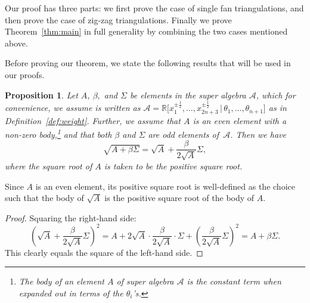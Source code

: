 \documentclass[pdftex]{sigma}
\numberwithin{equation}{section}
\newtheorem{Proposition}[Theorem]{Proposition}
 {\theoremstyle{Definition}
\newtheorem{Definition}[Theorem]{Definition}
\newtheorem{Example}[Theorem]{Example}
\newtheorem{Remark}[Theorem]{Remark}
\newtheorem{Question}[Theorem]{Question} }
\begin{document}
Our proof has three parts: we first prove the case of single fan triangulations, and then prove the case of zig-zag triangulations. Finally we prove Theorem~\ref{thm:main} in full generality by combining the two cases mentioned above.

Before proving our theorem, we state the following results that will be used in our proofs.

\begin{Proposition} \label{lemma:theta32}
 Let $A$, $\beta,$ and $\Sigma$ be elements in the super algebra $\mathcal A$, which for convenience, we assume is written as
 $\mathcal A = {\mathbb R}\bigl[x_1^{\pm\frac{1}{2}},\dots,x_{2n+3}^{\pm\frac{1}{2}} \,|\, \theta_1,\dots,\theta_{n+1}\bigr]$ as in Definition~{\rm \ref{def:weight}}.
 Further, we assume that $A$ is an even element with a non-zero body,\footnote{The \emph{body} of an element $A$ of super algebra $\mathcal A$ is the constant term when expanded out in terms of the $\theta_i$'s.}
 and that both $\beta$ and $\Sigma$ are odd elements of~$\mathcal A$. Then we have
 \[\sqrt{A+\beta\Sigma}= \sqrt{A}+\frac{\beta}{2\sqrt{A}}\Sigma,\]
 where the square root of $A$ is taken to be the positive square root.
\end{Proposition}

\begin{Remark}\rm
 Since $A$ is an even element, its positive square root is well-defined as the choice such that the body of $\sqrt{A}$ is the positive square root of the body of $A$.
\end{Remark}

\begin{proof}
 Squaring the right-hand side:
 \[\left(\sqrt{A}+\frac{\beta}{2\sqrt{A}}\Sigma\right)^2=A+2\sqrt{A}\cdot \frac{\beta}{2\sqrt{A}}\cdot \Sigma +\left(\frac{\beta}{2\sqrt{A}}\Sigma\right)^2=A+\beta\Sigma.\]
 This clearly equals the square of the left-hand side.
\end{proof}
\end{document}
